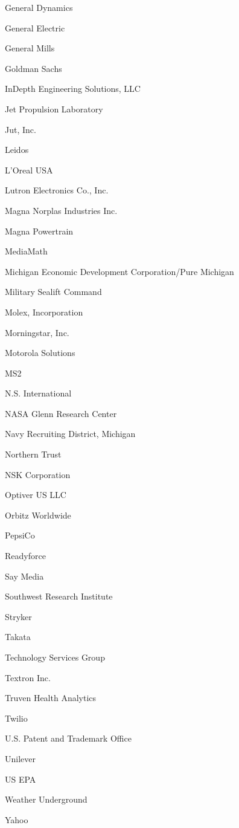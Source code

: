 \documentclass[twoside]{article}
\begin{document}
\begin{center}
\begin{multicols}{5}
\begin{FlushLeft}
\begin{compactitem}
\item General Dynamics
\item General Electric
\item General Mills
\item Goldman Sachs
\item InDepth Engineering Solutions, LLC
\item Jet Propulsion Laboratory
\item Jut, Inc.
\item Leidos
\item L'Oreal USA
\item Lutron Electronics Co., Inc.
\item Magna Norplas Industries Inc.
\item Magna Powertrain
\item MediaMath
\item Michigan Economic Development Corporation/Pure Michigan
\item Military Sealift Command
\item Molex, Incorporation
\item Morningstar, Inc.
\item Motorola Solutions
\item MS2
\item N.S. International
\item NASA Glenn Research Center
\item Navy Recruiting District, Michigan
\item Northern Trust
\item NSK Corporation
\item Optiver US LLC
\item Orbitz Worldwide
\item PepsiCo
\item Readyforce
\item Say Media
\item Southwest Research Institute
\item Stryker
\item Takata
\item Technology Services Group
\item Textron Inc.
\item Truven Health Analytics
\item Twilio
\item U.S. Patent and Trademark Office
\item Unilever
\item US EPA
\item Weather Underground
\item Yahoo

\end{compactitem}
\end{FlushLeft}
\end{multicols}
\end{center}
\end{document}
